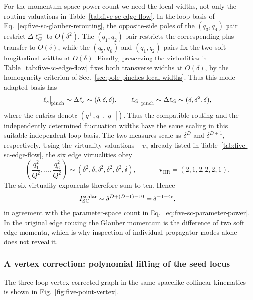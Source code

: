 \documentclass[a4paper,11pt]{article}
\newcommand{\HR}{\mathrm{HR}}
\begin{document}
For the momentum-space power count we need the local widths, not only the
routing valuations in Table~\ref{tab:five-sc-edge-flow}.  In the loop basis of
Eq.~\eqref{eq:five-sc-glauber-rerouting}, the opposite-side poles of the
\((q_3,q_4)\) pair restrict \(\Delta\ell_G^-\) to \(O(\delta^2)\).  The
\((q_1,q_2)\) pair restricts the corresponding plus transfer to
\(O(\delta)\), while the \((q_5,q_6)\) and \((q_1,q_2)\) pairs fix the two
soft longitudinal widths at \(O(\delta)\).  Finally, preserving the
virtualities in Table~\ref{tab:five-sc-edge-flow} fixes both transverse
widths at \(O(\delta)\), by the homogeneity criterion of
Sec.~\ref{sec:pole-pinches-local-widths}.  Thus this mode-adapted basis has
\begin{equation}
 \ell_s\big|_{\rm pinch}\sim\Delta\ell_s
 \sim(\delta,\delta,\delta),
 \qquad
 \ell_G\big|_{\rm pinch}\sim\Delta\ell_G
 \sim(\delta,\delta^2,\delta),
 \label{eq:five-sc-modes}
\end{equation}
where the entries denote \((q^+,q^-,|q_\perp|)\).  Thus the compatible routing
and the independently determined fluctuation widths have the same scaling in
this suitable independent loop basis.  The two measures scale as
\(\delta^D\) and \(\delta^{D+1}\), respectively.  Using the virtuality
valuations \(-v_e\) already listed in Table~\ref{tab:five-sc-edge-flow},
the six edge virtualities obey
\begin{equation}
 \left(\frac{q_1^2}{Q^2},\ldots,\frac{q_6^2}{Q^2}\right)
 \sim(\delta^2,\delta,\delta^2,\delta^2,\delta^2,\delta),
 \qquad -\boldsymbol v_{\HR}=(2,1,2,2,2,1).
 \label{eq:five-sc-virtualities}
\end{equation}
The six virtuality exponents therefore sum to ten.  Hence
\begin{equation}
 I_{\rm SC}^{\rm scalar}\sim
 \delta^{D+(D+1)-10}=\delta^{-1-4\epsilon},
 \label{eq:five-sc-momentum-power}
\end{equation}
in agreement with the parameter-space count in
Eq.~\eqref{eq:five-sc-parameter-power}.  In the original edge routing the
Glauber momentum is the difference of two soft edge momenta, which is why
inspection of individual propagator modes alone does not reveal it.

\subsubsection{A vertex correction: polynomial lifting of the seed locus}

The three-loop vertex-corrected graph in the same spacelike-collinear
kinematics is shown in Fig.~\ref{fig:five-point-vertex}.
\end{document}
